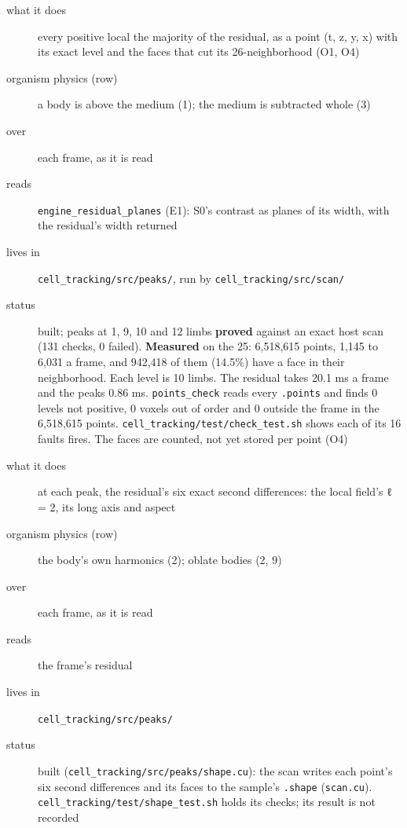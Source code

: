 \begin{description}
\item[{what it does}] every positive local the majority of the residual, as a point (t, z, y, x) with its exact level and the faces that cut its 26-neighborhood (O1, O4)
\item[{organism physics (row)}] a body is above the medium (1); the medium is subtracted whole (3)
\item[{over}] each frame, as it is read
\item[{reads}] \texttt{engine\_\allowbreak{}residual\_\allowbreak{}planes} (E1): S0's contrast as planes of its width, with the residual's width returned
\item[{lives in}] \texttt{cell\_\allowbreak{}tracking/\allowbreak{}src/\allowbreak{}peaks/\allowbreak{}}, run by \texttt{cell\_\allowbreak{}tracking/\allowbreak{}src/\allowbreak{}scan/\allowbreak{}}
\item[{status}] built; peaks at 1, 9, 10 and 12 limbs \textbf{proved} against an exact host scan (131 checks, 0 failed). \textbf{Measured} on the 25: 6,518,615 points, 1,145 to 6,031 a frame, and 942,418 of them (14.5\%) have a face in their neighborhood. Each level is 10 limbs. The residual takes 20.1 ms a frame and the peaks 0.86 ms. \texttt{points\_\allowbreak{}check} reads every \texttt{.\allowbreak{}points} and finds 0 levels not positive, 0 voxels out of order and 0 outside the frame in the 6,518,615 points. \texttt{cell\_\allowbreak{}tracking/\allowbreak{}test/\allowbreak{}check\_\allowbreak{}test.\allowbreak{}sh} shows each of its 16 faults fires. The faces are counted, not yet stored per point (O4)
\end{description}

\begin{description}
\item[{what it does}] at each peak, the residual's six exact second differences: the local field's ℓ = 2, its long axis and aspect
\item[{organism physics (row)}] the body's own harmonics (2); oblate bodies (2, 9)
\item[{over}] each frame, as it is read
\item[{reads}] the frame's residual
\item[{lives in}] \texttt{cell\_\allowbreak{}tracking/\allowbreak{}src/\allowbreak{}peaks/\allowbreak{}}
\item[{status}] built (\texttt{cell\_\allowbreak{}tracking/\allowbreak{}src/\allowbreak{}peaks/\allowbreak{}shape.\allowbreak{}cu}): the scan writes each point's six second differences and its faces to the sample's \texttt{.\allowbreak{}shape} (\texttt{scan.\allowbreak{}cu}). \texttt{cell\_\allowbreak{}tracking/\allowbreak{}test/\allowbreak{}shape\_\allowbreak{}test.\allowbreak{}sh} holds its checks; its result is not recorded
\end{description}

